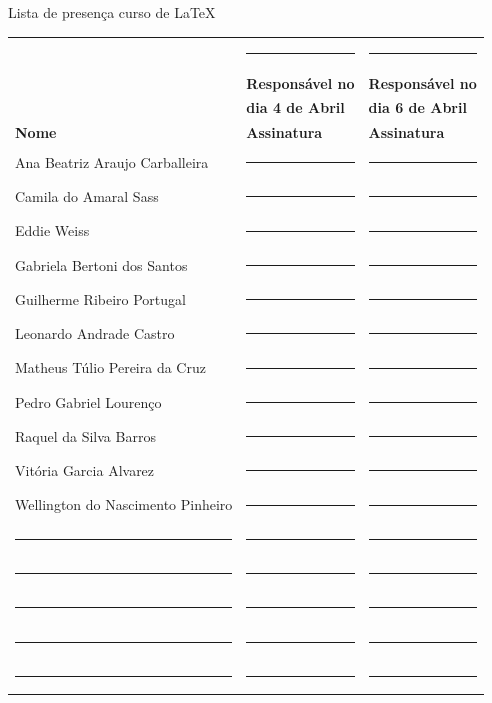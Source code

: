 \documentclass[12pt]{article}
\begin{document}
	\pagestyle{fancy}
	\begin{center}
		\textcolor{IEEEBlue}{\LARGE Lista de presença curso de \LaTeX}
	\end{center}
	\vspace{1.5cm}
	\begin{longtable}{lll}
										  			& \rule{4cm}{.1mm} 			&\rule{4cm}{.1mm}			\\[5pt]
										  			& \textbf{Responsável no}	&\textbf{Responsável no} 	\\
										  			& \textbf{dia 4 de Abril}	&\textbf{dia 6 de Abril} 	\\[25pt]
		\textbf{Nome}    				  			& \textbf{Assinatura} 		&\textbf{Assinatura} 		\\[15pt]
		Ana Beatriz Araujo Carballeira 	 \hrulefill & \rule{4cm}{.1mm} 			&\rule{4cm}{.1mm}			\\[15pt]
		Camila do Amaral  Sass 			 \hrulefill & \rule{4cm}{.1mm} 			&\rule{4cm}{.1mm}			\\[15pt]
		Eddie Weiss 					 \hrulefill & \rule{4cm}{.1mm} 			&\rule{4cm}{.1mm}			\\[15pt]
		Gabriela Bertoni dos Santos      \hrulefill & \rule{4cm}{.1mm} 			&\rule{4cm}{.1mm}			\\[15pt]
		Guilherme Ribeiro Portugal       \hrulefill & \rule{4cm}{.1mm} 			&\rule{4cm}{.1mm}			\\[15pt]
		Leonardo Andrade Castro          \hrulefill & \rule{4cm}{.1mm} 			&\rule{4cm}{.1mm}			\\[15pt]
		Matheus Túlio Pereira da Cruz    \hrulefill & \rule{4cm}{.1mm} 			&\rule{4cm}{.1mm}			\\[15pt]
		Pedro Gabriel Lourenço           \hrulefill & \rule{4cm}{.1mm} 			&\rule{4cm}{.1mm}			\\[15pt]
		Raquel da Silva Barros           \hrulefill & \rule{4cm}{.1mm} 			&\rule{4cm}{.1mm}			\\[15pt]
		Vitória Garcia Alvarez           \hrulefill & \rule{4cm}{.1mm} 			&\rule{4cm}{.1mm}			\\[15pt]
		Wellington do Nascimento Pinheiro\hrulefill & \rule{4cm}{.1mm} 			&\rule{4cm}{.1mm}			\\[15pt]
		\rule{7cm}{.1mm} 				 			& \rule{4cm}{.1mm} 			&\rule{4cm}{.1mm}			\\[15pt]
		\rule{7cm}{.1mm} 				 			& \rule{4cm}{.1mm} 			&\rule{4cm}{.1mm}			\\[15pt]
		\rule{7cm}{.1mm} 				 			& \rule{4cm}{.1mm} 			&\rule{4cm}{.1mm}			\\[15pt]
		\rule{7cm}{.1mm} 				 			& \rule{4cm}{.1mm} 			&\rule{4cm}{.1mm}			\\[15pt]
		\rule{7cm}{.1mm} 				 			& \rule{4cm}{.1mm} 			&\rule{4cm}{.1mm}			
	\end{longtable}
\end{document}
